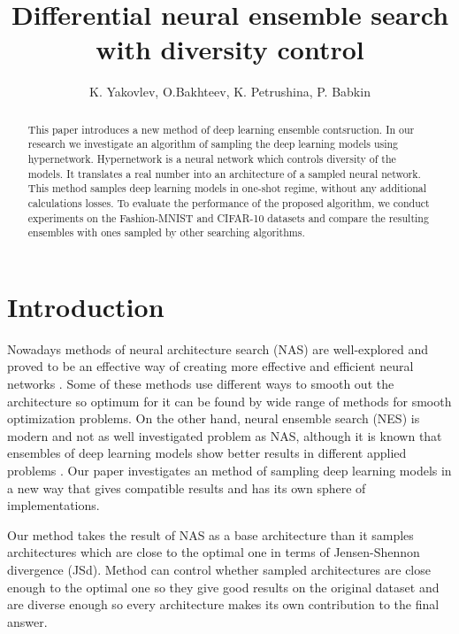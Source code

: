 \documentclass{article}
\title{Differential neural ensemble search with diversity control}
\author{K. Yakovlev, O.Bakhteev, K. Petrushina, P. Babkin
}
\date{}
\begin{document}
\maketitle

\begin{abstract}
	
This paper introduces a new method of deep learning ensemble contsruction.
In our research we investigate an algorithm of sampling the deep learning models using
hypernetwork. Hypernetwork is a neural network which controls diversity of the models. It translates a real number into an architecture of a sampled neural network. This method samples deep learning models in one-shot regime, without any additional calculations losses.
To evaluate the performance of the proposed algorithm, we conduct experiments on the Fashion-MNIST and CIFAR-10
datasets and compare the resulting ensembles with ones sampled by other searching algorithms.

\end{abstract}



\section{Introduction}

Nowadays methods of neural architecture search (NAS) are well-explored and proved to be an effective way of creating
more effective and efficient neural networks \citep{darts, robustify, xnas}. Some of these methods use different ways to smooth out the architecture so optimum for it can
be found by wide range of methods for smooth optimization problems. On the other hand, neural ensemble search (NES) is
modern and not as well investigated problem as NAS, although it is known that ensembles of deep learning models show better
results in different applied problems \citep{multi-head}.
Our paper investigates an method of sampling deep learning models in a new way that gives compatible results and has its own sphere
of implementations.

Our method takes the result of NAS as a base architecture than it samples architectures which are close to the optimal one in terms of Jensen-Shennon divergence (JSd). Method can control whether sampled architectures are close enough to the optimal one so they give good results on the original dataset and are diverse enough so every architecture makes its own contribution to the final answer.
\end{document}
